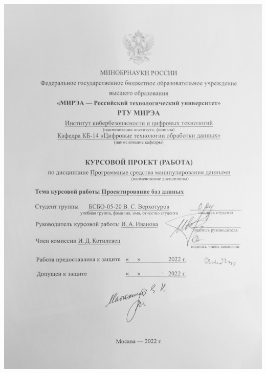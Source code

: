 \documentclass{mirea}
\begin{document}
	
	\begin{titlepage}
		
		\pagestyle{empty}
		
		\vspace*{-1.5cm}
		\hspace*{-3.2cm}
		\includegraphics[height=.89\paperheight]{titlepage.jpeg}
		\newpage
		

\end{titlepage}
\end{document}
